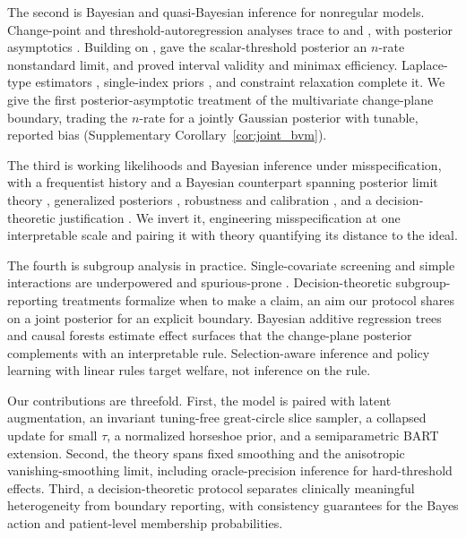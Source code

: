 \documentclass[11pt]{article}
\theoremstyle{definition}
\theoremstyle{plain}
\begin{document}
The second is Bayesian and quasi-Bayesian inference for nonregular models. Change-point and threshold-autoregression analyses trace to \citet{CarlinGelfandSmith1992} and \citet{GewekeTerui1993}, with posterior asymptotics \citep{GhosalGhoshSamanta1999}. Building on \citet{IbragimovHasminskii1981}, \citet{ChernozhukovHong2004} gave the scalar-threshold posterior an $n$-rate nonstandard limit, and \citet{Yu2012, Yu2015} proved interval validity and minimax efficiency. Laplace-type estimators \citep{ChernozhukovHong2003}, single-index priors \citep{Antoniadis2004}, and constraint relaxation \citep{Duan2019} complete it. We give the first posterior-asymptotic treatment of the multivariate change-plane boundary, trading the $n$-rate for a jointly Gaussian posterior with tunable, reported bias (Supplementary Corollary~\ref{cor:joint_bvm}).

The third is working likelihoods and Bayesian inference under misspecification, with a frequentist history \citep{White1982} and a Bayesian counterpart spanning posterior limit theory \citep{Kleijn2012, Miller2021}, generalized posteriors \citep{Bissiri2016}, robustness and calibration \citep{GrunwaldVanOmmen2017, Syring2019, Huggins2021}, and a decision-theoretic justification \citep{Mueller2013}. We invert it, engineering misspecification at one interpretable scale and pairing it with theory quantifying its distance to the ideal.

The fourth is subgroup analysis in practice. Single-covariate screening and simple interactions are underpowered and spurious-prone \citep{Wang2007, Lipkovich2017}. Decision-theoretic subgroup-reporting treatments \citep{Sivaganesan2011, BergerWangShen2014,Schnell2016} formalize when to make a claim, an aim our protocol shares on a joint posterior for an explicit boundary. Bayesian additive regression trees and causal forests \citep{Hill2011, HahnMurrayCarvalho2020} estimate effect surfaces that the change-plane posterior complements with an interpretable rule. Selection-aware inference \citep{GuoHe2021} and policy learning with linear rules \citep{Zhao2012owl, KitagawaTetenov2018, AtheyWager2021} target welfare, not inference on the rule.

Our contributions are threefold. First, the model is paired with latent augmentation, an invariant tuning-free great-circle slice sampler, a collapsed update for small $\tau$, a normalized horseshoe prior, and a semiparametric BART extension. Second, the theory spans fixed smoothing and the anisotropic vanishing-smoothing limit, including oracle-precision inference for hard-threshold effects. Third, a decision-theoretic protocol separates clinically meaningful heterogeneity from boundary reporting, with consistency guarantees for the Bayes action and patient-level membership probabilities.
\end{document}
